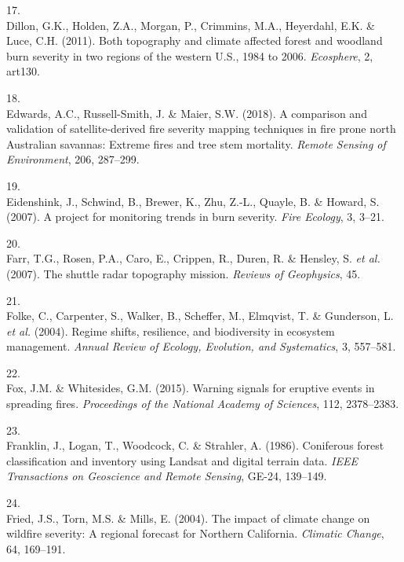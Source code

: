 \documentclass[]{article}
\begin{document}
\leavevmode\hypertarget{ref-dillon2011}{}%
17.\\
Dillon, G.K., Holden, Z.A., Morgan, P., Crimmins, M.A., Heyerdahl, E.K.
\& Luce, C.H. (2011). Both topography and climate affected forest and
woodland burn severity in two regions of the western U.S., 1984 to 2006.
\emph{Ecosphere}, 2, art130.

\leavevmode\hypertarget{ref-edwards2018}{}%
18.\\
Edwards, A.C., Russell-Smith, J. \& Maier, S.W. (2018). A comparison and
validation of satellite-derived fire severity mapping techniques in fire
prone north Australian savannas: Extreme fires and tree stem mortality.
\emph{Remote Sensing of Environment}, 206, 287--299.

\leavevmode\hypertarget{ref-eidenshink2007}{}%
19.\\
Eidenshink, J., Schwind, B., Brewer, K., Zhu, Z.-L., Quayle, B. \&
Howard, S. (2007). A project for monitoring trends in burn severity.
\emph{Fire Ecology}, 3, 3--21.

\leavevmode\hypertarget{ref-farr2007}{}%
20.\\
Farr, T.G., Rosen, P.A., Caro, E., Crippen, R., Duren, R. \& Hensley, S.
\emph{et al.} (2007). The shuttle radar topography mission.
\emph{Reviews of Geophysics}, 45.

\leavevmode\hypertarget{ref-folke2004}{}%
21.\\
Folke, C., Carpenter, S., Walker, B., Scheffer, M., Elmqvist, T. \&
Gunderson, L. \emph{et al.} (2004). Regime shifts, resilience, and
biodiversity in ecosystem management. \emph{Annual Review of Ecology,
Evolution, and Systematics}, 3, 557--581.

\leavevmode\hypertarget{ref-fox2015}{}%
22.\\
Fox, J.M. \& Whitesides, G.M. (2015). Warning signals for eruptive
events in spreading fires. \emph{Proceedings of the National Academy of
Sciences}, 112, 2378--2383.

\leavevmode\hypertarget{ref-franklin1986}{}%
23.\\
Franklin, J., Logan, T., Woodcock, C. \& Strahler, A. (1986). Coniferous
forest classification and inventory using Landsat and digital terrain
data. \emph{IEEE Transactions on Geoscience and Remote Sensing}, GE-24,
139--149.

\leavevmode\hypertarget{ref-fried2004}{}%
24.\\
Fried, J.S., Torn, M.S. \& Mills, E. (2004). The impact of climate
change on wildfire severity: A regional forecast for Northern
California. \emph{Climatic Change}, 64, 169--191.
\end{document}
